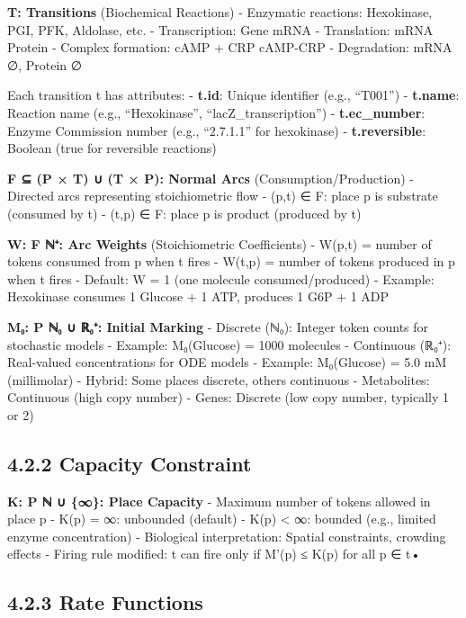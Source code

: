 \textbf{T: Transitions} (Biochemical Reactions) - Enzymatic reactions:
Hexokinase, PGI, PFK, Aldolase, etc. - Transcription: Gene \textrightarrow mRNA -
Translation: mRNA \textrightarrow Protein - Complex formation: cAMP + CRP \textrightarrow cAMP-CRP -
Degradation: mRNA \textrightarrow ∅, Protein \textrightarrow ∅

Each transition t has attributes: - \textbf{t.id}: Unique identifier
(e.g., ``T001'') - \textbf{t.name}: Reaction name (e.g., ``Hexokinase'',
``lacZ\_transcription'') - \textbf{t.ec\_number}: Enzyme Commission
number (e.g., ``2.7.1.1'' for hexokinase) - \textbf{t.reversible}:
Boolean (true for reversible reactions)

\textbf{F ⊆ (P × T) ∪ (T × P): Normal Arcs} (Consumption/Production) -
Directed arcs representing stoichiometric flow - (p,t) ∈ F: place p is
substrate (consumed by t) - (t,p) ∈ F: place p is product (produced by
t)

\textbf{W: F \textrightarrow ℕ⁺: Arc Weights} (Stoichiometric Coefficients) - W(p,t) =
number of tokens consumed from p when t fires - W(t,p) = number of
tokens produced in p when t fires - Default: W = 1 (one molecule
consumed/produced) - Example: Hexokinase consumes 1 Glucose + 1 ATP,
produces 1 G6P + 1 ADP

\textbf{M₀: P \textrightarrow ℕ₀ ∪ ℝ₀⁺: Initial Marking} - Discrete (ℕ₀): Integer
token counts for stochastic models - Example: M₀(Glucose) = 1000
molecules - Continuous (ℝ₀⁺): Real-valued concentrations for ODE models
- Example: M₀(Glucose) = 5.0 mM (millimolar) - Hybrid: Some places
discrete, others continuous - Metabolites: Continuous (high copy number)
- Genes: Discrete (low copy number, typically 1 or 2)

\hypertarget{capacity-constraint}{%
\subsection{4.2.2 Capacity Constraint}\label{capacity-constraint}}

\textbf{K: P \textrightarrow ℕ ∪ \{∞\}: Place Capacity} - Maximum number of tokens
allowed in place p - K(p) = ∞: unbounded (default) - K(p) \textless{} ∞:
bounded (e.g., limited enzyme concentration) - Biological
interpretation: Spatial constraints, crowding effects - Firing rule
modified: t can fire only if M'(p) ≤ K(p) for all p ∈ t•

\hypertarget{rate-functions}{%
\subsection{4.2.3 Rate Functions}\label{rate-functions}}

